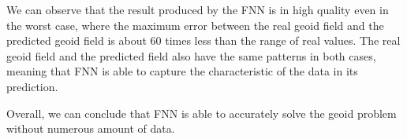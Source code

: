 We can observe that the result produced by the FNN is in high quality even in the worst case, where the maximum error between the real geoid field and the predicted geoid field is about 60 times less than the range of real values. The real geoid field and the predicted field also have the same patterns in both cases, meaning that FNN is able to capture the characteristic of the data in its prediction.

Overall, we can conclude that FNN is able to accurately solve the geoid problem without numerous amount of data.